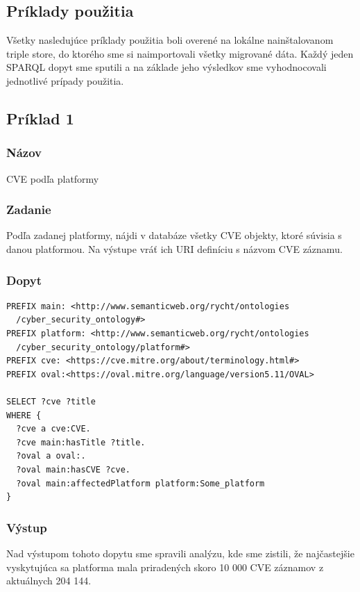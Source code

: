 \documentclass[12pt, a4paper, oneside]{book}
\begin{document}
\subsection{Príklady použitia}
Všetky nasledujúce príklady použitia boli overené na lokálne nainštalovanom triple store, do ktorého sme si naimportovali všetky migrované dáta. Každý jeden SPARQL dopyt sme sputili a na základe jeho výsledkov sme vyhodnocovali jednotlivé prípady použitia.
\subsection*{Príklad 1}
\label{sec:priklad1}
\subsubsection*{Názov}
CVE podľa platformy

\subsubsection*{Zadanie}
Podľa zadanej platformy, nájdi v databáze všetky CVE objekty, ktoré súvisia s danou platformou. Na výstupe vráť ich URI definíciu s názvom CVE záznamu.

\subsubsection*{Dopyt}
\begin{small}
\begin{verbatim}
PREFIX main: <http://www.semanticweb.org/rycht/ontologies
  /cyber_security_ontology#>
PREFIX platform: <http://www.semanticweb.org/rycht/ontologies
  /cyber_security_ontology/platform#>
PREFIX cve: <https://cve.mitre.org/about/terminology.html#>
PREFIX oval:<https://oval.mitre.org/language/version5.11/OVAL>

SELECT ?cve ?title
WHERE {
  ?cve a cve:CVE.
  ?cve main:hasTitle ?title.
  ?oval a oval:.
  ?oval main:hasCVE ?cve.
  ?oval main:affectedPlatform platform:Some_platform
}
\end{verbatim}
\end{small}


\subsubsection*{Výstup}
Nad výstupom tohoto dopytu sme spravili analýzu, kde sme zistili, že najčastejšie vyskytujúca sa platforma mala priradených skoro 10 000 CVE záznamov z aktuálnych 204 144.
\end{document}

